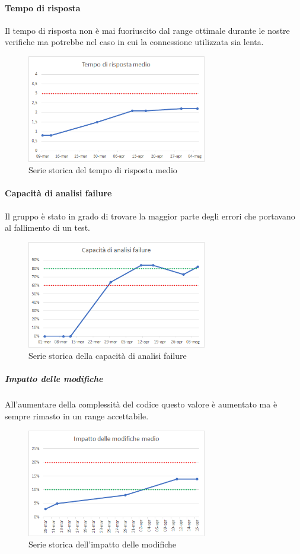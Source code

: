     \paragraph{Tempo di risposta} \Spazio
    Il tempo di risposta non è mai fuoriuscito dal range ottimale durante le nostre verifiche ma potrebbe nel caso in cui la connessione utilizzata sia lenta.
    \begin{figure}[H]
    	\centering 
    	\includegraphics[width=0.7\textwidth]{Images/risposta.png}
    	\caption{Serie storica del tempo di risposta medio}
    	\label{risposta} 
    \end{figure}
    \paragraph{Capacità di analisi failure} \Spazio
    Il gruppo è stato in grado di trovare la maggior parte degli errori che portavano al fallimento di un test.
    \begin{figure}[H]
    	\centering 
    	\includegraphics[width=0.7\textwidth]{Images/cap.png}
    	\caption{Serie storica della capacità di analisi failure}
    	\label{cap} 
    \end{figure}
     \subparagraph{Impatto delle modifiche} \Spazio
    All'aumentare della complessità del codice questo valore è aumentato ma è sempre rimasto in un range accettabile.
    \begin{figure}[H]
    	\centering 
    	\includegraphics[width=0.7\textwidth]{Images/modifiche.png}
    	\caption{Serie storica dell'impatto delle modifiche}
    	\label{modifiche} 
    \end{figure}
